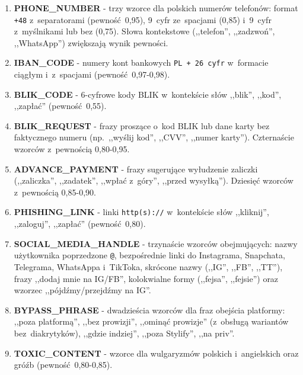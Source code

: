 \begin{enumerate}
  \item \textbf{PHONE\_NUMBER} - trzy wzorce dla polskich numerów telefonów:
    format \texttt{+48} z~separatorami (pewność~0,95), 9~cyfr
    ze~spacjami (0,85) i~9~cyfr z~myślnikami lub bez (0,75).
    Słowa kontekstowe (,,telefon'', ,,zadzwoń'', ,,WhatsApp'')
    zwiększają wynik pewności.

  \item \textbf{IBAN\_CODE} - numery kont bankowych \texttt{PL + 26~cyfr}
    w~formacie ciągłym i~z~spacjami (pewność~0,97-0,98).

  \item \textbf{BLIK\_CODE} - 6-cyfrowe kody BLIK w~kontekście
    słów ,,blik'', ,,kod'', ,,zapłać'' (pewność~0,55).

  \item \textbf{BLIK\_REQUEST} - frazy proszące o~kod BLIK lub dane karty
    bez faktycznego numeru (np.\ ,,wyślij kod'', ,,CVV'', ,,numer karty'').
    Czternaście wzorców z~pewnością 0,80-0,95.

  \item \textbf{ADVANCE\_PAYMENT} - frazy sugerujące wyłudzenie zaliczki
    (,,zaliczka'', ,,zadatek'', ,,wpłać z~góry'', ,,przed wysyłką'').
    Dziesięć wzorców z~pewnością 0,85-0,90.

  \item \textbf{PHISHING\_LINK} - linki \texttt{http(s)://} w~kontekście
    słów ,,kliknij'', ,,zaloguj'', ,,zapłać'' (pewność~0,80).

  \item \textbf{SOCIAL\_MEDIA\_HANDLE} - trzynaście wzorców obejmujących:
    nazwy użytkownika poprzedzone \texttt{@}, bezpośrednie linki do
    Instagrama, Snapchata, Telegrama, WhatsAppa i~TikToka, skrócone
    nazwy (,,IG'', ,,FB'', ,,TT''), frazy ,,dodaj mnie na IG/FB'',
    kolokwialne formy (,,fejsa'', ,,fejsie'') oraz wzorzec
    ,,pójdźmy/przejdźmy na IG''.

  \item \textbf{BYPASS\_PHRASE} - dwadzieścia wzorców dla fraz
    obejścia platformy: ,,poza platformą'', ,,bez prowizji'',
    ,,ominąć prowizje'' (z~obsługą wariantów bez~diakrytyków),
    ,,gdzie indziej'', ,,poza Stylify'', ,,na priv''.

  \item \textbf{TOXIC\_CONTENT} - wzorce dla wulgaryzmów polskich
    i~angielskich oraz gróźb (pewność~0,80-0,85).
\end{enumerate}

